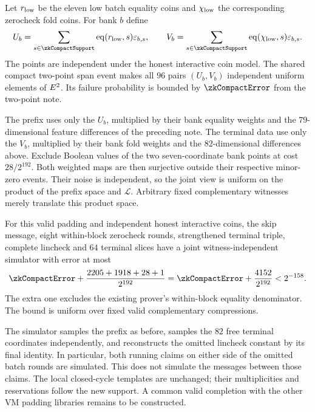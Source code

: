 Let $r_{\rm low}$ be the eleven low batch equality coins and $\chi_{\rm low}$ the corresponding zerocheck fold coins. For bank $b$ define
\[
 U_b=\sum_{s\in\zkCompactSupport}\eq(r_{\rm low},s)\varepsilon_{b,s},\qquad
 V_b=\sum_{s\in\zkCompactSupport}\eq(\fc_{\rm low},s)\varepsilon_{b,s}.
\]
The points are independent under the honest interactive coin model. The shared compact two-point span event makes all $96$ pairs $(U_b,V_b)$ independent uniform elements of $E^2$. Its failure probability is bounded by $\zkCompactError$ from the two-point note.

The prefix uses only the $U_b$, multiplied by their bank equality weights and the $79$-dimensional feature differences of the preceding note. The terminal data use only the $V_b$, multiplied by their bank fold weights and the $82$-dimensional differences above. Exclude Boolean values of the two seven-coordinate bank points at cost $28/2^{192}$. Both weighted maps are then surjective outside their respective minor-zero events. Their noise is independent, so the joint view is uniform on the product of the prefix space and $\mathcal L$. Arbitrary fixed complementary witnesses merely translate this product space.

\begin{theorem}
For this valid padding and independent honest interactive coins, the skip message, eight within-block zerocheck rounds, strengthened terminal triple, complete lincheck and $64$ terminal slices have a joint witness-independent simulator with error at most
\[
 \zkCompactError+\frac{2205+1918+28+1}{2^{192}}
 =\zkCompactError+\frac{4152}{2^{192}}<2^{-158}.
\]
The extra one excludes the existing prover's within-block equality denominator. The bound is uniform over fixed valid complementary compressions.
\end{theorem}

The simulator samples the prefix as before, samples the $82$ free terminal coordinates independently, and reconstructs the omitted lincheck constant by its final identity. In particular, both running claims on either side of the omitted batch rounds are simulated. This does not simulate the messages between those claims. The local closed-cycle templates are unchanged; their multiplicities and reservations follow the new support. A common valid completion with the other VM padding libraries remains to be constructed.

